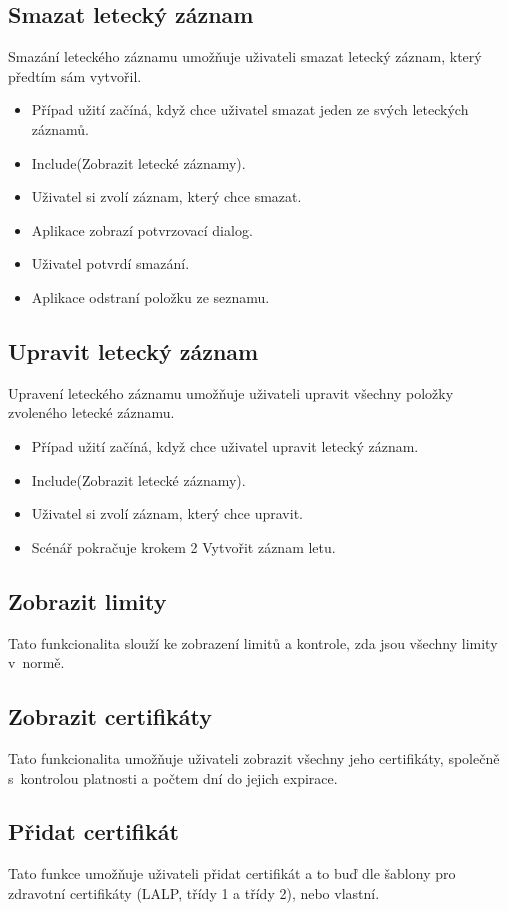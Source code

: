 \documentclass[thesis=M,czech]{FITthesis}[2012/06/26]
\begin{document}
\subsection{Smazat letecký záznam}
Smazání leteckého záznamu umožňuje uživateli smazat letecký záznam, který předtím sám vytvořil.

\begin{itemize}
\item Případ užití začíná, když chce uživatel smazat jeden ze svých leteckých záznamů.
\item Include(Zobrazit letecké záznamy).
\item Uživatel si zvolí záznam, který chce smazat.
\item Aplikace zobrazí potvrzovací dialog.
\item Uživatel potvrdí smazání.
\item Aplikace odstraní položku ze seznamu.
\end{itemize}

\subsection{Upravit letecký záznam}
Upravení leteckého záznamu umožňuje uživateli upravit všechny položky zvoleného letecké záznamu.

\begin{itemize}
\item Případ užití začíná, když chce uživatel upravit letecký záznam.
\item Include(Zobrazit letecké záznamy).
\item Uživatel si zvolí záznam, který chce upravit.
\item Scénář pokračuje krokem 2 Vytvořit záznam letu.
\end{itemize}

\subsection{Zobrazit limity}
Tato funkcionalita slouží ke zobrazení limitů a kontrole, zda jsou všechny limity v~normě.

\subsection{Zobrazit certifikáty}
Tato funkcionalita umožňuje uživateli zobrazit všechny jeho certifikáty, společně s~kontrolou platnosti a počtem dní do jejich expirace.

\subsection{Přidat certifikát}
Tato funkce umožňuje uživateli přidat certifikát a to buď dle šablony pro zdravotní certifikáty (LALP, třídy 1 a třídy 2), nebo vlastní.
\end{document}
